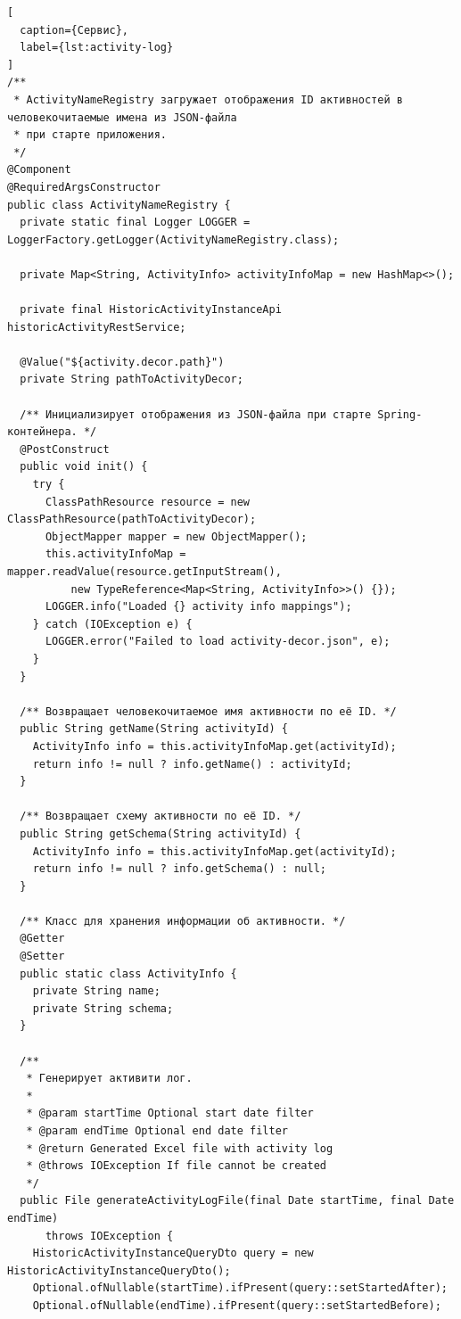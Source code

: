 \begin{lstlisting}[
  caption={Сервис},
  label={lst:activity-log}
]
/**
 * ActivityNameRegistry загружает отображения ID активностей в человекочитаемые имена из JSON-файла
 * при старте приложения.
 */
@Component
@RequiredArgsConstructor
public class ActivityNameRegistry {
  private static final Logger LOGGER = LoggerFactory.getLogger(ActivityNameRegistry.class);

  private Map<String, ActivityInfo> activityInfoMap = new HashMap<>();

  private final HistoricActivityInstanceApi historicActivityRestService;

  @Value("${activity.decor.path}")
  private String pathToActivityDecor;

  /** Инициализирует отображения из JSON-файла при старте Spring-контейнера. */
  @PostConstruct
  public void init() {
    try {
      ClassPathResource resource = new ClassPathResource(pathToActivityDecor);
      ObjectMapper mapper = new ObjectMapper();
      this.activityInfoMap = mapper.readValue(resource.getInputStream(),
          new TypeReference<Map<String, ActivityInfo>>() {});
      LOGGER.info("Loaded {} activity info mappings");
    } catch (IOException e) {
      LOGGER.error("Failed to load activity-decor.json", e);
    }
  }

  /** Возвращает человекочитаемое имя активности по её ID. */
  public String getName(String activityId) {
    ActivityInfo info = this.activityInfoMap.get(activityId);
    return info != null ? info.getName() : activityId;
  }

  /** Возвращает схему активности по её ID. */
  public String getSchema(String activityId) {
    ActivityInfo info = this.activityInfoMap.get(activityId);
    return info != null ? info.getSchema() : null;
  }

  /** Класс для хранения информации об активности. */
  @Getter
  @Setter
  public static class ActivityInfo {
    private String name;
    private String schema;
  }

  /**
   * Генерирует активити лог.
   *
   * @param startTime Optional start date filter
   * @param endTime Optional end date filter
   * @return Generated Excel file with activity log
   * @throws IOException If file cannot be created
   */
  public File generateActivityLogFile(final Date startTime, final Date endTime)
      throws IOException {
    HistoricActivityInstanceQueryDto query = new HistoricActivityInstanceQueryDto();
    Optional.ofNullable(startTime).ifPresent(query::setStartedAfter);
    Optional.ofNullable(endTime).ifPresent(query::setStartedBefore);


\end{lstlisting}
